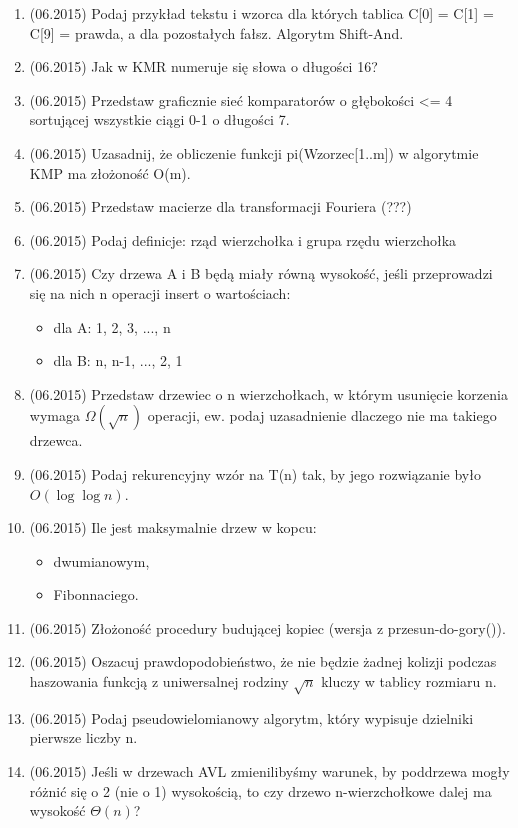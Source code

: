 \documentclass[10pt]{article}%
\begin{document}
\begin{enumerate}
-----------------------------------------------------
\item (06.2015) Podaj przykład tekstu i wzorca dla których tablica C[0] = C[1] = C[9] = prawda, a dla pozostałych fałsz. Algorytm Shift-And.
\item (06.2015) Jak w KMR numeruje się słowa o długości 16?
\item (06.2015) Przedstaw graficznie sieć komparatorów o głębokości <= 4 sortującej wszystkie ciągi 0-1 o długości 7.
\item (06.2015) Uzasadnij, że obliczenie funkcji pi(Wzorzec[1..m]) w algorytmie KMP ma złożoność O(m).
\item (06.2015) Przedstaw macierze dla transformacji Fouriera (???) 
\item (06.2015) Podaj definicje: rząd wierzchołka i grupa rzędu wierzchołka
\item (06.2015) Czy drzewa A i B będą miały równą wysokość, jeśli przeprowadzi się na nich n operacji insert o wartościach:
\begin{itemize}
\item dla A: 1, 2, 3, ..., n 
\item dla B: n, n-1, ..., 2, 1 
\end{itemize}
\item (06.2015) Przedstaw drzewiec o n wierzchołkach, w którym usunięcie korzenia wymaga $\Omega(\sqrt{n})$ operacji, ew. podaj uzasadnienie dlaczego nie ma takiego drzewca.
\item (06.2015) Podaj rekurencyjny wzór na T(n) tak, by jego rozwiązanie było $O(\log \log n)$.
\item (06.2015) Ile jest maksymalnie drzew w kopcu:
\begin{itemize}
\item dwumianowym,
\item Fibonnaciego.
\end{itemize}
\item (06.2015) Złożoność procedury budującej kopiec (wersja z przesun-do-gory()). 
\item (06.2015) Oszacuj prawdopodobieństwo, że nie będzie żadnej kolizji podczas haszowania funkcją z uniwersalnej rodziny $\sqrt{n}$ kluczy w tablicy rozmiaru n. 
\item (06.2015) Podaj pseudowielomianowy algorytm, który wypisuje dzielniki pierwsze liczby n.
\item (06.2015) Jeśli w drzewach AVL zmienilibyśmy warunek, by poddrzewa mogły różnić się o 2 (nie o 1) wysokością, to czy drzewo n-wierzchołkowe dalej ma wysokość $\Theta(n)$? 

\end{enumerate}
\end{document}
